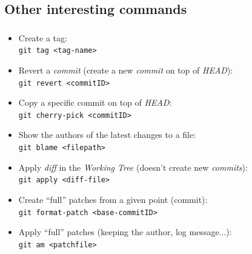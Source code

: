 \subsection{Other interesting commands}
\begin{frame}
  \frametitle{\insertsubsection}

  \begin{itemize}
  \item Create a tag:\\
    \texttt{git tag <tag-name>}
    \vspacing
  \item Revert a \textit{commit} (create a new \textit{commit} on top of \textit{HEAD}):\\
    \texttt{git revert <commitID>}
    \vspacing
  \item Copy a specific commit on top of \textit{HEAD}:\\
    \texttt{git cherry-pick <commitID>}
    \vspacing
  \item Show the authors of the latest changes to a file:\\
    \texttt{git blame <filepath>}
    \vspacing
  \item Apply \textit{diff} in the \textit{Working Tree} (doesn't
    create new \textit{commits}):\\
    \texttt{git apply <diff-file>}
    \vspacing
  \item Create ``full'' patches from a given point (commit):\\
    \texttt{git format-patch <base-commitID>}
    \vspacing
  \item Apply ``full'' patches (keeping the author, log message...):\\
    \texttt{git am <patchfile>}
    \vspacing
  \end{itemize}
\end{frame}


